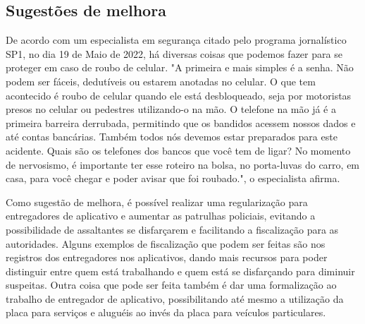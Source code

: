     \subsection{Sugestões de melhora}

        De acordo com um especialista em segurança citado pelo programa jornalístico SP1, no dia 
        19 de Maio de 2022, há diversas coisas que podemos fazer para se proteger em caso de
        roubo de celular. "A primeira e mais simples é a senha. Não podem ser fáceis, dedutíveis
        ou estarem anotadas no celular. O que tem acontecido é roubo de celular quando ele está
        desbloqueado, seja por motoristas presos no celular ou pedestres utilizando-o na mão. O
        telefone na mão já é a primeira barreira derrubada, permitindo que os bandidos acessem
        nossos dados e até contas bancárias. Também todos nós devemos estar preparados para este 
        acidente. Quais são os telefones dos bancos que você tem de ligar? No momento de nervosismo,
        é importante ter esse roteiro na bolsa, no porta-luvas do carro, em casa, para você chegar
        e poder avisar que foi roubado.", o especialista afirma.

        Como sugestão de melhora, é possível realizar uma regularização para entregadores de
        aplicativo e aumentar as patrulhas policiais, evitando a possibilidade de assaltantes 
        se disfarçarem e facilitando a fiscalização para as autoridades. Alguns exemplos de 
        fiscalização que podem ser feitas são nos registros dos entregadores nos aplicativos, 
        dando mais recursos para poder distinguir entre quem está trabalhando e quem está se 
        disfarçando para diminuir suspeitas. Outra coisa que pode ser feita também é dar uma 
        formalização ao trabalho de entregador de aplicativo, possibilitando até mesmo a 
        utilização da placa para serviços e aluguéis ao invés da placa para veículos particulares.
